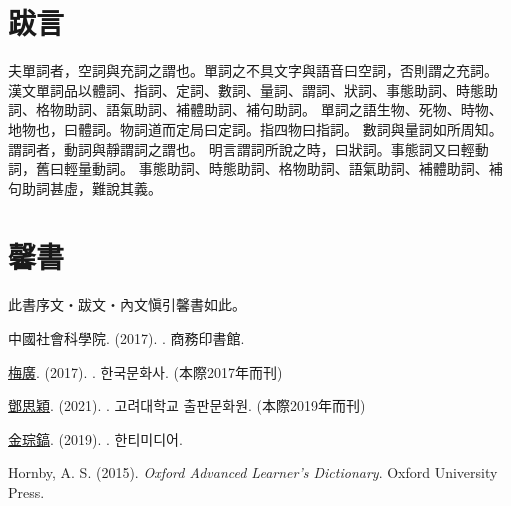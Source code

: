 \chapter*{跋言}
夫單詞者，空詞與充詞之謂也。單詞之不具文字與語音曰空詞，否則謂之充詞。
漢文單詞品以體詞、指詞、定詞、數詞、量詞、謂詞、狀詞、事態助詞、時態助詞、格物助詞、語氣助詞、補體助詞、補句助詞。
單詞之語生物、死物、時物、地物也，曰體詞。物詞道而定局曰定詞。指四物曰指詞。
數詞與量詞如所周知。謂詞者，動詞與靜謂詞之謂也。
明言謂詞所說之時，曰狀詞。事態詞又曰輕動詞，舊曰輕量動詞。
事態助詞、時態助詞、格物助詞、語氣助詞、補體助詞、補句助詞甚虛，難說其義。

\chapter*{馨書}
此書序文・跋文・內文愼引馨書如此。
\par 中國社會科學院. (2017). . 商務印書館.
\par \underline{梅廣}. (2017). . 한국문화사. (本際2017年而刊)
\par \underline{鄧思穎}. (2021). . 고려대학교 출판문화원. (本際2019年而刊)
\par \underline{金琮鎬}. (2019). . 한티미디어.
\par Hornby, A. S. (2015). \textit{Oxford Advanced Learner's Dictionary}. Oxford University Press.

